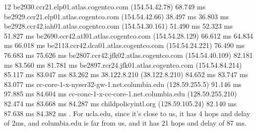 \documentclass{report}
\begin{document}
\begin{problem}
\begin{answer}{45em}
12  be2930.ccr21.elp01.atlas.cogentco.com (154.54.42.78)  68.749 ms\newline
    be2929.ccr21.elp01.atlas.cogentco.com (154.54.42.66)  38.497 ms  36.803 ms  be2928.ccr42.iah01.atlas.cogentco.com (154.54.30.161)  51.490 ms  52.323 ms  51.827 ms  be2690.ccr42.atl01.atlas.cogentco.com (154.54.28.129)  66.612 ms  64.834 ms  66.018 ms  be2113.ccr42.dca01.atlas.cogentco.com (154.54.24.221)  76.490 ms  76.683 ms  75.626 ms  be2807.ccr42.jfk02.atlas.cogentco.com (154.54.40.109)  82.181 ms  83.560 ms  81.781 ms  be2897.rcr24.jfk01.atlas.cogentco.com (154.54.84.214)  85.117 ms  83.047 ms  83.262 ms  38.122.8.210 (38.122.8.210)  84.652 ms  83.747 ms  83.077 ms  cc-core-1-x-nyser32-gw-1.net.columbia.edu (128.59.255.5)  91.146 ms  97.885 ms  84.604 ms  cc-conc-1-x-cc-core-1.net.columbia.edu (128.59.255.210)  82.474 ms  83.668 ms  84.287 ms  childpolicyintl.org (128.59.105.24)  82.140 ms  87.638 ms  84.382 ms\newline
{}. For ucla.edu, since it's close to us, it has 4 hops and delay of 2ms, and columbia.edu is far from us, and it has 
21 hops and delay of 87 ms.
    
    \end{answer}

\end{problem}

\newpage
\end{document}

